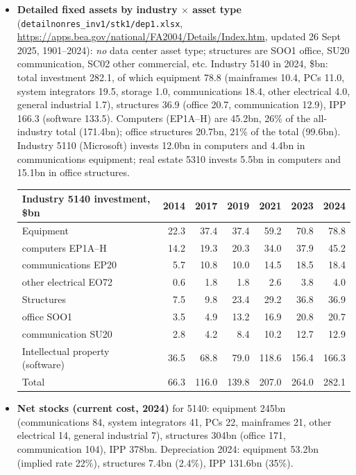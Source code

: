 \documentclass[11pt]{article}
\begin{document}
\begin{itemize}
  \item \textbf{Detailed fixed assets by industry $\times$ asset type} (\texttt{detailnonres\_inv1/stk1/dep1.xlsx}, \url{https://apps.bea.gov/national/FA2004/Details/Index.htm}, updated 26 Sept 2025, 1901--2024): \emph{no} data center asset type; structures are SOO1 office, SU20 communication, SC02 other commercial, etc. Industry 5140 in 2024, \$bn: total investment 282.1, of which equipment 78.8 (mainframes 10.4, PCs 11.0, system integrators 19.5, storage 1.0, communications 18.4, other electrical 4.0, general industrial 1.7), structures 36.9 (office 20.7, communication 12.9), IPP 166.3 (software 133.5). Computers (EP1A--H) are 45.2bn, 26\% of the all-industry total (171.4bn); office structures 20.7bn, 21\% of the total (99.6bn). Industry 5110 (Microsoft) invests 12.0bn in computers and 4.4bn in communications equipment; real estate 5310 invests 5.5bn in computers and 15.1bn in office structures.
  \begin{center}\footnotesize
  \begin{tabular}{lrrrrrr}
  \toprule
  Industry 5140 investment, \$bn & 2014 & 2017 & 2019 & 2021 & 2023 & 2024 \\
  \midrule
  Equipment & 22.3 & 37.4 & 37.4 & 59.2 & 70.8 & 78.8 \\
  \quad computers EP1A--H & 14.2 & 19.3 & 20.3 & 34.0 & 37.9 & 45.2 \\
  \quad communications EP20 & 5.7 & 10.8 & 10.0 & 14.5 & 18.5 & 18.4 \\
  \quad other electrical EO72 & 0.6 & 1.8 & 1.8 & 2.6 & 3.8 & 4.0 \\
  Structures & 7.5 & 9.8 & 23.4 & 29.2 & 36.8 & 36.9 \\
  \quad office SOO1 & 3.5 & 4.9 & 13.2 & 16.9 & 20.8 & 20.7 \\
  \quad communication SU20 & 2.8 & 4.2 & 8.4 & 10.2 & 12.7 & 12.9 \\
  Intellectual property (software) & 36.5 & 68.8 & 79.0 & 118.6 & 156.4 & 166.3 \\
  Total & 66.3 & 116.0 & 139.8 & 207.0 & 264.0 & 282.1 \\
  \bottomrule
  \end{tabular}
  \end{center}
  \item \textbf{Net stocks (current cost, 2024)} for 5140: equipment 245bn (communications 84, system integrators 41, PCs 22, mainframes 21, other electrical 14, general industrial 7), structures 304bn (office 171, communication 104), IPP 378bn. Depreciation 2024: equipment 53.2bn (implied rate 22\%), structures 7.4bn (2.4\%), IPP 131.6bn (35\%).

\end{itemize}
\end{document}

